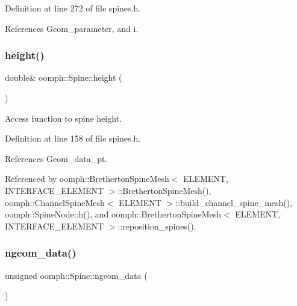 Definition at line 272 of file spines.\+h.



References Geom\+\_\+parameter, and i.

\mbox{\label{classoomph_1_1Spine_a7502bf089f4001796d5ef801cf104a28}} 
\subsubsection{\texorpdfstring{height()}{height()}}
{\footnotesize\ttfamily double\& oomph\+::\+Spine\+::height (\begin{DoxyParamCaption}{ }\end{DoxyParamCaption})\hspace{0.3cm}{\ttfamily [inline]}}



Access function to spine height. 



Definition at line 158 of file spines.\+h.



References Geom\+\_\+data\+\_\+pt.



Referenced by oomph\+::\+Bretherton\+Spine\+Mesh$<$ E\+L\+E\+M\+E\+N\+T, I\+N\+T\+E\+R\+F\+A\+C\+E\+\_\+\+E\+L\+E\+M\+E\+N\+T $>$\+::\+Bretherton\+Spine\+Mesh(), oomph\+::\+Channel\+Spine\+Mesh$<$ E\+L\+E\+M\+E\+N\+T $>$\+::build\+\_\+channel\+\_\+spine\+\_\+mesh(), oomph\+::\+Spine\+Node\+::h(), and oomph\+::\+Bretherton\+Spine\+Mesh$<$ E\+L\+E\+M\+E\+N\+T, I\+N\+T\+E\+R\+F\+A\+C\+E\+\_\+\+E\+L\+E\+M\+E\+N\+T $>$\+::reposition\+\_\+spines().

\mbox{\label{classoomph_1_1Spine_a6c609c4f717e486ee70d57eb937b306e}} 
\subsubsection{\texorpdfstring{ngeom\+\_\+data()}{ngeom\_data()}}
{\footnotesize\ttfamily unsigned oomph\+::\+Spine\+::ngeom\+\_\+data (\begin{DoxyParamCaption}{ }\end{DoxyParamCaption})\hspace{0.3cm}{\ttfamily [inline]}}



